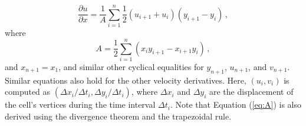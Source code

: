 \documentclass{article}
\begin{document}
    \begin{equation}
        \frac{\partial u}{\partial x}  = \frac{1}{A}\sum_{i=1}^{n}\frac{1}{2}\left( u_{i+1} + u_{i} \right)\left( y_{i+1} - y_{i} \right) \, ,
        \label{eq:dudx_sum}
    \end{equation}
    where
    \begin{equation}
        A = \frac{1}{2}\sum_{i=1}^{n}\left( x_{i}y_{i+1} -  x_{i+1}y_{i} \right)\, ,
        \label{eq:A}
    \end{equation}
    and $x_{n+1} = x_1$, and similar other cyclical equalities for $y_{n+1}$, $u_{n+1}$, and $v_{n+1}$. Similar equations also hold for the other velocity derivatives. Here, $(u_{i},v_{i})$ is computed as $(\Delta x_{i}/\Delta t_{i}, \Delta y_{i}/\Delta t_{i})$, where $\Delta x_{i}$ and $\Delta y_{i}$ are the displacement of the cell's vertices during the time interval $\Delta t_{i}$. Note that Equation (\ref{eq:A}) is also derived using the divergence theorem and the trapezoidal rule.
\end{document}
